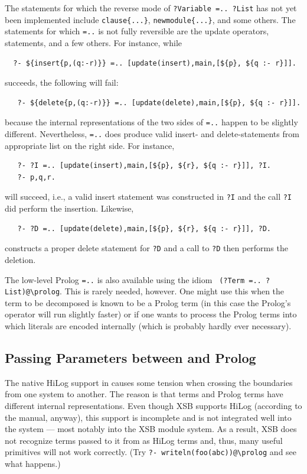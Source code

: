 \documentclass[11pt]{article}
\newcommand{\ERGO}{\mbox{\smaller{\ensuremath{\cal{E}}\smaller{{\sc{RGO}}}}}\xspace}
\newcommand{\FLSYSTEM}{\ERGO}
\newcommand{\bs}{\textbackslash}
\begin{document}
The statements for which the reverse mode of \texttt{?Variable =.. ?List}
has not yet been
implemented include \texttt{clause\{...\}},  \texttt{newmodule\{...\}},
and some others. The
statements for which \texttt{=..} is not fully reversible are the update
operators, statements, and a few others. For instance, while
\begin{verbatim}
  ?- ${insert{p,(q:-r)}} =.. [update(insert),main,[${p}, ${q :- r}]].
\end{verbatim}
succeeds, the following will fail:
\begin{verbatim}
   ?- ${delete{p,(q:-r)}} =.. [update(delete),main,[${p}, ${q :- r}]].
\end{verbatim}
because the internal representations of the two sides of \texttt{=..}
happen to be slightly different. 
Nevertheless, \texttt{=..} does produce valid insert- and
delete-statements from appropriate list on the right side. For instance,
\begin{verbatim}
   ?- ?I =.. [update(insert),main,[${p}, ${r}, ${q :- r}]], ?I.
   ?- p,q,r.
\end{verbatim}
will succeed, i.e., a valid insert statement was constructed in \texttt{?I}
and the call \texttt{?I} did perform the insertion. Likewise,
\begin{verbatim}
   ?- ?D =.. [update(delete),main,[${p}, ${r}, ${q :- r}]], ?D.
\end{verbatim}
constructs a proper delete statement for \texttt{?D} and a call to
\texttt{?D} then performs the deletion.  


The low-level Prolog {\tt =..} is also available using the idiom {\tt
  (?Term =.. ?List)@\bs{}prolog}.  This is rarely needed, however. One
might use this when the term to be decomposed is known to be a Prolog term
(in this case the Prolog's operator will run slightly faster) or if one
wants to process the Prolog terms into which \FLSYSTEM literals are encoded
internally (which is probably hardly ever necessary).


\subsection{Passing Parameters between \FLSYSTEM and Prolog}\label{sec-passing-args}

The native HiLog support in \FLSYSTEM causes some tension when crossing the
boundaries from one system to another. The reason is that \FLSYSTEM terms and Prolog
terms have different internal representations. Even though XSB supports
HiLog (according to the manual, anyway), this support is incomplete and is
not integrated well into the system --- most notably into the XSB module
system. As a result, XSB does not recognize terms passed to it from \FLSYSTEM
as HiLog terms and, thus, many useful primitives will not work correctly.
(Try {\tt ?- writeln(foo(abc))@\bs{}prolog} and see what happens.)
\end{document}
